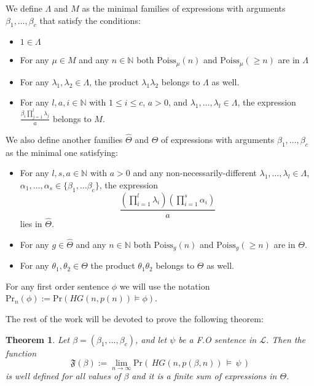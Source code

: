 \documentclass[11pt,notitlepage,a4paper]{article}
\newtheorem{theorem}{Theorem}[section]
\theoremstyle{definition}
\newcommand{\N}{\mathbb{N}}
\newcommand{\Ln}{\lim\limits_{n\to \infty}}
\begin{document}
We define $\Lambda$ and $M$ as the minimal families
of expressions with arguments $\beta_1,\dots, \beta_c$ that satisfy the conditions:
\begin{itemize}
	\item $1\in \Lambda$
	\item For any $\mu\in M$ and any $n\in \N$ both
	$\mathrm{Poiss}_{\mu}(n)$ and $\mathrm{Poiss}_\mu(\geq n)$ are in $\Lambda$
	\item For any $\lambda_1,\lambda_2 \in \Lambda$, the
	product $\lambda_1\lambda_2$ belongs to $\Lambda$ as well.
	\item For any $l,a,i\in \N$ with $1\leq i \leq c$,
	$a > 0$, and $\lambda_1,\dots, \lambda_l\in \Lambda$,
	the expression $\frac{\beta_i \prod_{j=1}^{l}\lambda_j}{a}$
	belongs to $M$.		
\end{itemize}
We also define another families $\widehat{\Theta}$ and $\Theta$ of expressions with arguments
$\beta_1,\dots, \beta_c$ as the minimal one satisfying:
\begin{itemize}
	\item For any $l,s,a\in \N$ with $a>0$ and any 
	non-necessarily-different $\lambda_1,\dots, \lambda_l\in \Lambda$,
	$\alpha_1,\dots,\alpha_s\in \{\beta_1,\dots \beta_c\}$,
	the expression 
	\[\frac{\left(\prod_{i=1}^{l} \lambda_i \right)
		\left( \prod_{i=1}^{s}\alpha_i \right)}{a}\] 
	lies in $\widehat{\Theta}$.
	\item For any $g\in \widehat{\Theta}$ and any $n\in \N$ both
	$\mathrm{Poiss}_g(n)$ and $\mathrm{Poiss}_g(\geq n)$ are in $\Theta$.
	\item For any $\theta_1, \theta_2\in \Theta$ the product
	$\theta_1\theta_2$ belongs to $\Theta$ as well.
\end{itemize}


For any first order sentence $\phi$
we will use the notation 
$\mathrm{Pr}_n(\phi):=\mathrm{Pr}(HG(n,p(n))\models \phi)$. \par

The rest of the work will be devoted to prove the following theorem:

\begin{theorem}\label{thm:THEONE} 
	Let $\beta=(\beta_1,\dots, \beta_c)$, and let $\psi$ be a 
	F.O sentence in $\mathcal{L}$. Then the function
	\[
	\mathfrak{F}(\beta):=\Ln \mathrm{Pr}(\, HG(n,p(\beta,n))\, \models \, \psi \,)
	\]
	is well defined for all values of $\beta$ and it is a finite sum 
	of expressions in $\Theta$.
\end{theorem}
\end{document}

